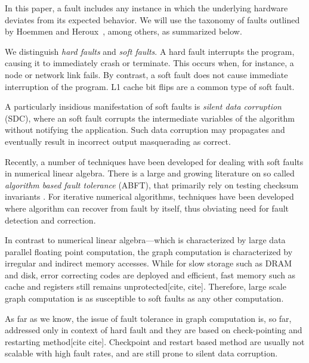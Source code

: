 


In this paper, a fault includes any instance in which the underlying
hardware deviates from its expected behavior.
We will use the taxonomy of faults outlined by Hoemmen and Heroux~\cite{hoemmen2011reliability}, 
among others, as summarized below.

%
We distinguish \emph{hard faults} and \emph{soft faults}. A hard fault interrupts the program, 
causing it to immediately crash or terminate. This occurs when, for instance, a node or network 
link fails. By contrast, a soft fault does not cause immediate interruption of the program. L1 cache 
bit flips
are a common type of soft fault. 

A particularly insidious manifestation of soft faults is \emph{silent data corruption} (SDC), where 
an soft fault corrupts the intermediate variables of the algorithm without notifying the
application. Such data corruption may propagates and eventually result in incorrect output
masquerading as correct. 

Recently, a number of techniques have been developed for dealing with soft faults in numerical
linear algebra. There is a large and growing literature on so called
\emph{algorithm based fault tolerance} (ABFT), that primarily rely on testing checksum invariants
\cite{huang1984abft,luk1988abft,du2012abft,shantharam2012ftcg}. 
For iterative numerical algorithms, techniques have been developed where 
algorithm can recover from fault by itself, thus obviating need for fault detection and
correction\cite{hoemmen2011reliability,sao2013sscg, elliott2016exploiting}. 
% 

In contrast to numerical linear algebra---which is characterized by large data parallel floating point 
computation,  the graph computation is characterized by irregular and indirect memory accesses.
While for slow storage
such as DRAM and disk, error correcting codes are deployed and efficient, fast memory 
such as cache and registers still remains unprotected[cite, cite]. Therefore, large scale graph computation is
as susceptible to soft faults as any other computation. 

As far as we know, the issue of fault tolerance 
in graph computation is, so far, addressed only in context of hard fault and they are based on 
check-pointing and restarting method[cite cite]. Checkpoint and restart based method are usually not 
scalable with high fault rates, and are still prone to silent data corruption.  
%

